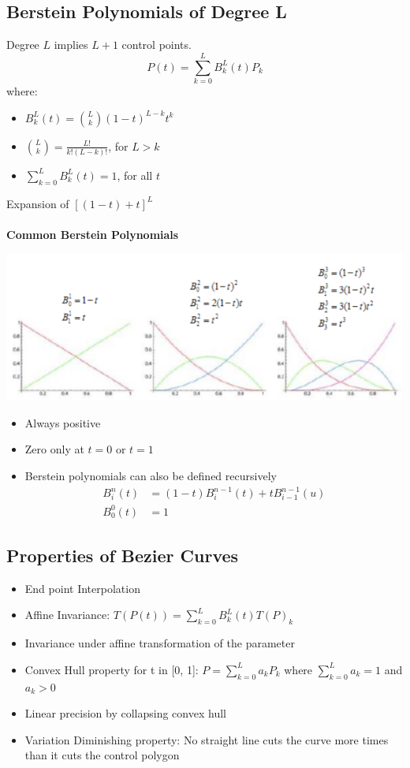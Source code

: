 \documentclass{article}
\begin{document}
\subsection*{Berstein Polynomials of Degree L}
Degree $L$ implies $L + 1$ control points.
\[P(t) = \sum_{k=0}^L B_k^L (t) P_k\]
where:
\begin{itemize}
    \item $B_k^L(t) = {L \choose k} (1-t)^{L - k} t^k$
    \item ${L \choose k} = \frac{L!}{k!(L - k)!}$, for $L > k$
    \item $\sum_{k = 0}^L B^L_k (t) = 1$, for all $t$
\end{itemize}
Expansion of $[(1 - t) + t]^L$\\\\
\textbf{Common Berstein Polynomials}
\begin{center}
    \includegraphics*[scale=1]{W3_5.png}
\end{center}
\begin{itemize}
    \item Always positive
    \item Zero only at $t = 0$ or $t = 1$
    \item Berstein polynomials can also be defined recursively
    \begin{align*}
        B_i^n(t) &= (1-t) B_i^{n-1}(t) + t B_{i - 1}^{n-1} (u)\\
        B_0^0 (t) &= 1
    \end{align*}
\end{itemize}

\subsection*{Properties of Bezier Curves}
\begin{itemize}
    \item End point Interpolation
    \item Affine Invariance: $T(P(t)) = \sum_{k = 0}^L B_k^L(t) T(P)_k$
    \item Invariance under affine transformation of the parameter
    \item Convex Hull property for t in [0, 1]: $P = \sum_{k = 0}^L a_k P_k$ where $\sum_{k = 0}^L a_k = 1$ and $a_k > 0$
    \item Linear precision by collapsing convex hull
    \item Variation Diminishing property: No straight line cuts the curve more times than it cuts the control polygon
\end{itemize}
\end{document}
